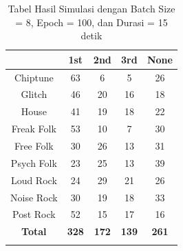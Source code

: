 \begin{longtable}[c]{|c|c|c|c|c|}
	\hline
	\textbf{}      & \textbf{1st} & \textbf{2nd} & \textbf{3rd} & \textbf{None} \\ \hline
	\endfirsthead
	\endhead
	Chiptune       & 63           & 6            & 5            & 26            \\ \hline
	Glitch         & 46           & 20           & 16           & 18            \\ \hline
	House          & 41           & 19           & 18           & 22            \\ \hline
	Freak Folk     & 53           & 10           & 7            & 30            \\ \hline
	Free Folk      & 30           & 26           & 13           & 31            \\ \hline
	Psych Folk     & 23           & 25           & 13           & 39            \\ \hline
	Loud Rock      & 24           & 29           & 21           & 26            \\ \hline
	Noise Rock     & 30           & 19           & 18           & 33            \\ \hline
	Post Rock      & 52           & 15           & 17           & 16            \\ \hline
	\textbf{Total} & \textbf{328} & \textbf{172} & \textbf{139} & \textbf{261}  \\ \hline
	\caption{Tabel Hasil Simulasi dengan Batch Size = 8, Epoch = 100, dan Durasi = 15 detik}
	\label{tab:my-table}\\
\end{longtable}

